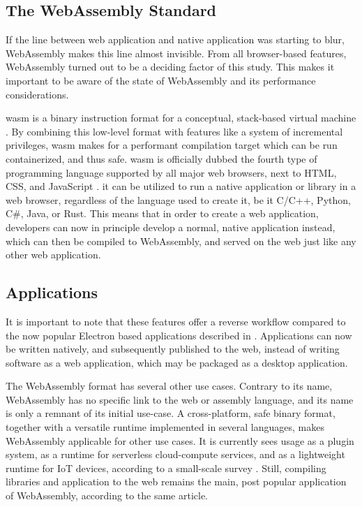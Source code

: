 \subsection{The WebAssembly Standard}
\label{sec:background-wasm}

If the line between web application and native application was starting to blur, 
WebAssembly makes this line almost invisible. 
From all browser-based features, WebAssembly turned out to be a deciding factor of this study. This makes it important to be aware of the state of WebAssembly and its performance considerations.

\ac{wasm} is a binary instruction format for a conceptual, stack-based virtual machine \citep{contributors_webassembly_2022}.
By combining this low-level format with features like a system of incremental privileges, \ac{wasm} makes for a performant compilation target which can be run containerized, and thus safe.
\ac{wasm} is officially dubbed the fourth type of programming language supported by all major web browsers, next to HTML, CSS, and JavaScript \citep{w3c_world_2019}.
it can be utilized to run a native application or library in a web browser, regardless of the language used to create it, be it C/C++, Python, C\#, Java, or Rust. 
This means that in order to create a web application, developers can now in principle develop a normal, native application instead, which can then be compiled to WebAssembly, and served on the web just like any other web application. 


\subsection*{Applications}

It is important to note that these features offer a reverse workflow compared to the now popular Electron based applications described in .
Applications can now be written natively, and subsequently published to the web, instead of writing software as a web application, which may be packaged as a desktop application. 

The WebAssembly format has several other use cases.
Contrary to its name, WebAssembly has no specific link to the web or assembly language, and its name is only a remnant of its initial use-case.
A cross-platform, safe binary format, together with a versatile runtime implemented in several languages, makes WebAssembly applicable for other use cases. 
It is currently sees usage as a plugin system, as a runtime for serverless cloud-compute services, and as a lightweight runtime for IoT devices, according to a small-scale survey \citep{eberhardt_state_2022}. 
Still, compiling libraries and application to the web remains the main, post popular application of WebAssembly, according to the same article. 

